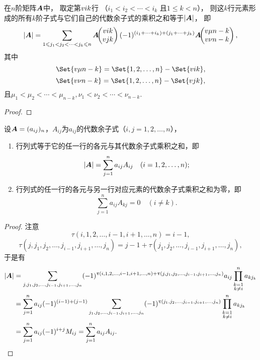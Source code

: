 \begin{theorem}[拉普拉斯定理]\label{theorem:行列式.拉普拉斯定理}
在\(n\)阶矩阵\(\boldsymbol{A}\)中，
取定第\(v{i}{k}\)行
（\(i_1<i_2<\dotsb<i_k\)
且\(1 \leqslant k < n\)），
则这\(k\)行元素形成的所有\(k\)阶子式与它们自己的代数余子式的乘积之和等于\(\abs{\boldsymbol{A}}\)，%
即\begin{equation}
	\abs{\boldsymbol{A}} =
	\sum\limits_{1 \leqslant j_1 < j_2 < \dotsb < j_k \leqslant n}
	\boldsymbol{A}\kern-3.8pt\begin{pmatrix}
		v{i}{k} \\
		v{j}{k}
	\end{pmatrix}
	(-1)^{(i_1+\dotsb+i_k)+(j_1+\dotsb+j_k)}
	\boldsymbol{A}\kern-3.8pt\begin{pmatrix}
		v{\mu}{n-k} \\
		v{\nu}{n-k}
	\end{pmatrix},
\end{equation}
其中\[
	\Set{ \v{\mu}{n-k} } = \Set{ 1,2,\dotsc,n } - \Set{ \v{i}{k} },
\]\[
	\Set{ \v{\nu}{n-k} } = \Set{ 1,2,\dotsc,n } - \Set{ \v{j}{k} },
\]
且\(\mu_1<\mu_2<\dotsb<\mu_{n-k},
\nu_1<\nu_2<\dotsb<\nu_{n-k}\).
\begin{proof}

\end{proof}
\end{theorem}

\begin{theorem}
设\(\boldsymbol{A}=(a_{ij})_n\)，\(A_{ij}\)为\(a_{ij}\)的代数余子式（\(i,j=1,2,\dotsc,n\)），%
\begin{enumerate}
\item 行列式等于它的任一行的各元与其代数余子式乘积之和，即\[
\abs{\boldsymbol{A}}=\sum\limits_{j=1}^n a_{ij} A_{ij}
\quad(i=1,2,\dotsc,n);
\]

\item 行列式的任一行的各元与另一行对应元素的代数余子式乘积之和为零，即\[
\sum\limits_{j=1}^n a_{ij} A_{kj} = 0 \quad (i \neq k).
\]
\end{enumerate}
\begin{proof}
注意\[
\tau(i,1,2,\dotsc,i-1,i+1,\dotsc,n) = i-1,
\]\[
\tau(j,j_1,j_2,\dotsc,j_{i-1},j_{i+1},\dotsc,j_n) = j-1+\tau(j_1,j_2,\dotsc,j_{i-1},j_{i+1},\dotsc,j_n),
\]于是有\begin{align*}
\abs{\boldsymbol{A}}
&= \sum\limits_{j,j_1,j_2,\dotsc,j_{i-1},j_{i+1},\dotsc,j_n}
	(-1)^{\uptau(i,1,2,\dotsc,i-1,i+1,\dotsc,n) + \uptau(j,j_1,j_2,\dotsc,j_{i-1},j_{i+1},\dotsc,j_n)} a_{ij} \prod\limits_{\substack{k=1 \\ k \neq i}}^n a_{k j_k} \\
&= \sum\limits_{j=1}^n a_{ij} (-1)^{(i-1)+(j-1)}
	\sum\limits_{j_1,j_2,\dotsc,j_{i-1},j_{i+1},\dotsc,j_n}
		(-1)^{\uptau(j_1,j_2,\dotsc,j_{i-1},j_{i+1},\dotsc,j_n)}
			\prod\limits_{\substack{k=1 \\ k \neq i}}^n a_{k j_k} \\
&= \sum\limits_{j=1}^n a_{ij} (-1)^{i+j} M_{ij}
= \sum\limits_{j=1}^n a_{ij} A_{ij}.
\qedhere
\end{align*}
\end{proof}
\end{theorem}

